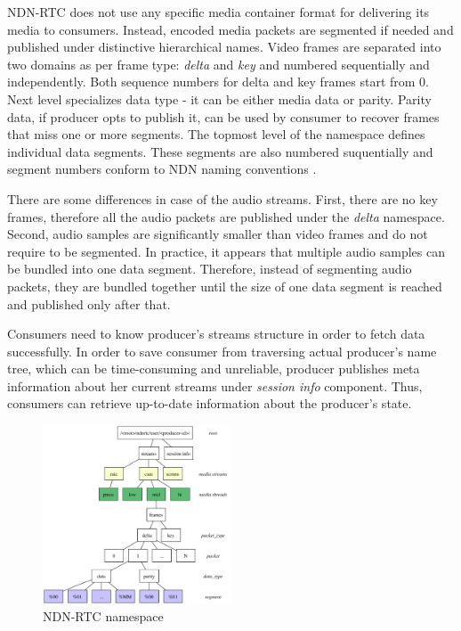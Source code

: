 \documentclass[10pt]{proc}
\begin{document}
NDN-RTC does not use any specific media container format for delivering its media to consumers. Instead, encoded media packets are segmented if needed and published under distinctive hierarchical names. Video frames are separated into two domains as per frame type: \textit{delta} and \textit{key} and numbered sequentially and independently. Both sequence numbers for delta and key frames start from 0. Next level specializes data type - it can be either media data or parity. Parity data, if producer opts to publish it, can be used by consumer to recover frames that miss one or more segments. The topmost level of the namespace defines individual data segments. These segments are also numbered suquentially and segment numbers conform to NDN naming conventions \cite{ndn_naming}.

There are some differences in case of the audio streams. First, there are no key frames, therefore all the audio packets are published under the \textit{delta} namespace. Second, audio samples are significantly smaller than video frames and do not require to be segmented. In practice, it appears that multiple audio samples can be bundled into one data segment. Therefore, instead of segmenting audio packets, they are bundled together until the size of one data segment is reached and published only after that.

Consumers need to know producer's streams structure in order to fetch data successfully. In order to save consumer from traversing actual producer's name tree, which can be time-consuming and unreliable, producer publishes meta information about her current streams under \textit{session info} component. Thus, consumers can retrieve up-to-date information about the producer's state.

\begin{figure}[t!]
\centering
\includegraphics[width=0.5\textwidth]{namespace}
\caption{NDN-RTC namespace}
\label{fig:namespace}
\end{figure}
\end{document}
